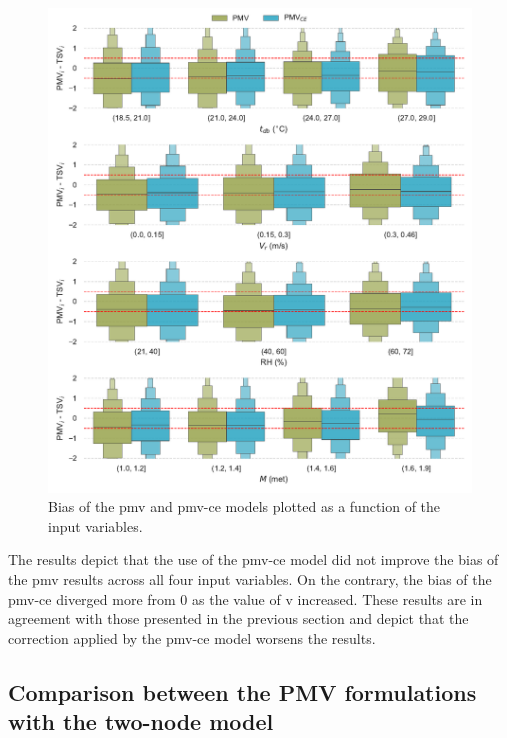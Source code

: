 \begin{figure}[htb!]
    \centering
    \includegraphics[width=\textwidth]{figures/bias_models}
    \caption{Bias of the \ac{pmv} and \ac{pmv-ce} models plotted as a function of the input variables.}
    \label{fig:bias_models}
\end{figure}
The results depict that the use of the \ac{pmv-ce} model did not improve the bias of the \ac{pmv} results across all four input variables.
On the contrary, the bias of the \ac{pmv-ce} diverged more from 0 as the value of \ac{v} increased.
These results are in agreement with those presented in the previous section and depict that the correction applied by the \ac{pmv-ce} model worsens the results. 

\subsection{Comparison between the PMV formulations with the two-node model}\label{subsec:comparison-between-the-pmv-formulations-wih-the-two-node-model} %

